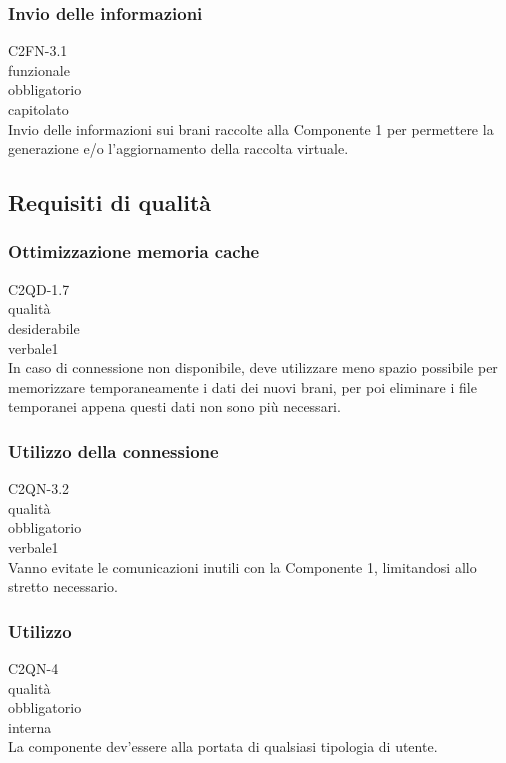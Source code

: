 \subsubsection*{Invio delle informazioni}
 C2FN-3.1 \\
 funzionale \\
 obbligatorio \\
 capitolato \\
Invio delle informazioni sui brani raccolte alla Componente 1 per permettere la
generazione e/o l'aggiornamento della raccolta virtuale.

\subsection{Requisiti di qualit\`a}
\subsubsection*{Ottimizzazione memoria cache}
 C2QD-1.7 \\
 qualit\`a \\
 desiderabile \\
 verbale1 \\
In caso di connessione non disponibile, deve utilizzare meno spazio possibile
per memorizzare temporaneamente i dati dei nuovi brani, per poi eliminare i file
temporanei appena questi dati non sono pi\`u necessari.

\subsubsection*{Utilizzo della connessione}
 C2QN-3.2 \\
 qualit\`a \\
 obbligatorio \\
 verbale1 \\
Vanno evitate le comunicazioni inutili con la Componente 1, limitandosi allo
stretto necessario.

\subsubsection*{Utilizzo}
 C2QN-4\\
 qualit\`a \\
 obbligatorio \\
 interna \\
La componente dev'essere alla portata di qualsiasi tipologia di utente.

